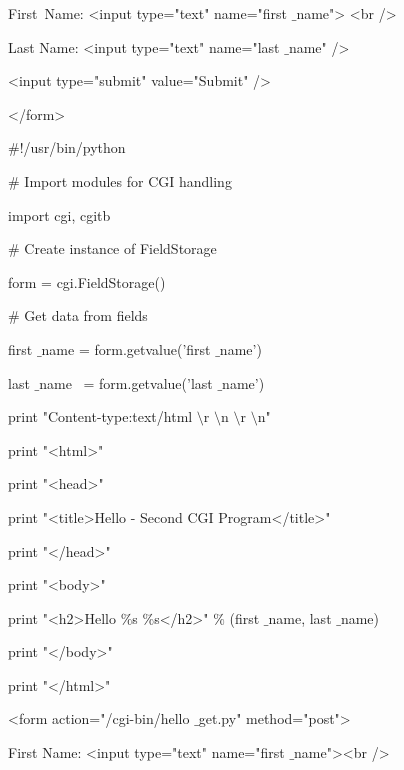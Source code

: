 \begin{12pt}
\begin{12pt}
\begin{12pt}
\begin{12pt}
\begin{12pt}
\begin{12pt}
\begin{12pt}
\noindent 
First~Name: <input type="text" name="first $  \_  $name">  <br /> \par
\vspace{12pt}
\noindent 
Last Name: <input type="text" name="last $  \_  $name" /> \par
\noindent 
<input type="submit" value="Submit" /> \par
\noindent 
</form> \par
\vspace{12pt}
\noindent 
 $  \#  $!/usr/bin/python \par
\vspace{12pt}
\noindent 
 $  \#  $ Import modules for CGI handling  \par
\noindent 
import cgi, cgitb  \par
\vspace{12pt}
\noindent 
 $  \#  $ Create instance of FieldStorage  \par
\noindent 
form = cgi.FieldStorage()  \par
\vspace{12pt}
\noindent 
 $  \#  $ Get data from fields \par
\noindent 
first $  \_  $name = form.getvalue('first $  \_  $name') \par
\noindent 
last $  \_  $name~ = form.getvalue('last $  \_  $name') \par
\vspace{12pt}
\noindent 
print "Content-type:text/html $  \setminus  $r $  \setminus  $n $  \setminus  $r $  \setminus  $n" \par
\noindent 
print "<html>" \par
\noindent 
print "<head>" \par
\noindent 
print "<title>Hello - Second CGI Program</title>" \par
\noindent 
print "</head>" \par
\noindent 
print "<body>" \par
\noindent 
print "<h2>Hello  $  \%  $s  $  \%  $s</h2>"  $  \%  $ (first $  \_  $name, last $  \_  $name) \par
\noindent 
print "</body>" \par
\noindent 
print "</html>" \par
\vspace{12pt}
\noindent 
<form action="/cgi-bin/hello $  \_  $get.py" method="post"> \par
\noindent 
First Name: <input type="text" name="first $  \_  $name"><br /> \par

\end{12pt}
\end{12pt}
\end{12pt}
\end{12pt}
\end{12pt}
\end{12pt}
\end{12pt}

